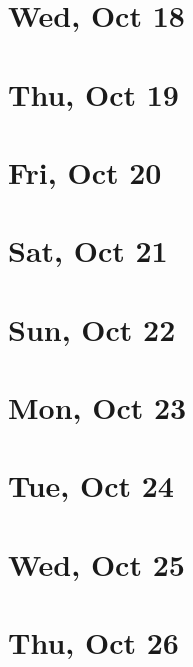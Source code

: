 	\section{Wed, Oct 18}
		
		
	\section{Thu, Oct 19}
		
		
	\section{Fri, Oct 20}
		
		
	\section{Sat, Oct 21}
		
		
	\section{Sun, Oct 22}
		
		
	\section{Mon, Oct 23}
		
		
	\section{Tue, Oct 24}
		
		
	\section{Wed, Oct 25}
		
		
	\section{Thu, Oct 26}
		
		
